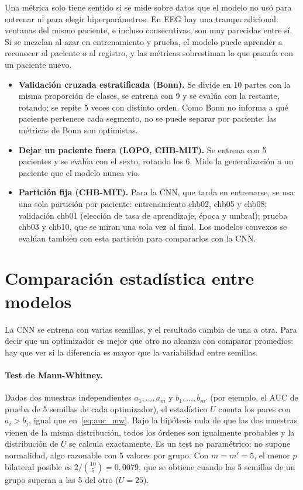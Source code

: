 Una métrica solo tiene sentido si se mide sobre datos que el modelo no usó para entrenar ni para elegir
hiperparámetros. En EEG hay una trampa adicional: ventanas del mismo paciente, e incluso consecutivas, son muy
parecidas entre sí. Si se mezclan al azar en entrenamiento y prueba, el modelo puede aprender a reconocer al
paciente o al registro, y las métricas sobrestiman lo que pasaría con un paciente nuevo.
\begin{itemize}
  \item \textbf{Validación cruzada estratificada (Bonn).} Se divide en 10 partes con la misma proporción de clases,
        se entrena con 9 y se evalúa con la restante, rotando; se repite 5 veces con distinto orden. Como Bonn no
        informa a qué paciente pertenece cada segmento, no se puede separar por paciente: las métricas de Bonn son
        optimistas.
  \item \textbf{Dejar un paciente fuera (LOPO, CHB-MIT).} Se entrena con 5 pacientes y se evalúa con el sexto,
        rotando los 6. Mide la generalización a un paciente que el modelo nunca vio.
  \item \textbf{Partición fija (CHB-MIT).} Para la CNN, que tarda en entrenarse, se usa una sola partición por paciente:
        entrenamiento chb02, chb05 y chb08; validación chb01 (elección de tasa de aprendizaje, época y umbral); prueba
        chb03 y chb10, que se miran una sola vez al final. Los modelos convexos se evalúan también con esta partición
        para compararlos con la CNN.
\end{itemize}

\section{Comparación estadística entre modelos}
\label{sec:tests}

La CNN se entrena con varias semillas, y el resultado cambia de una a otra. Para decir que un optimizador es mejor que
otro no alcanza con comparar promedios: hay que ver si la diferencia es mayor que la variabilidad entre semillas.

\paragraph{Test de Mann-Whitney.} Dadas dos muestras independientes $a_1,\dots,a_{m}$ y $b_1,\dots,b_{m'}$ (por ejemplo,
el AUC de prueba de 5 semillas de cada optimizador), el estadístico $U$ cuenta los pares con $a_i > b_j$, igual que
en~\eqref{eq:auc_mw}. Bajo la hipótesis nula de que las dos muestras vienen de la misma distribución, todos los órdenes
son igualmente probables y la distribución de $U$ se calcula exactamente. Es un test no paramétrico: no supone
normalidad, algo razonable con 5 valores por grupo. Con $m = m' = 5$, el menor $p$ bilateral posible es
$2/\binom{10}{5} = 0{,}0079$, que se obtiene cuando las 5 semillas de un grupo superan a las 5 del otro ($U = 25$).

